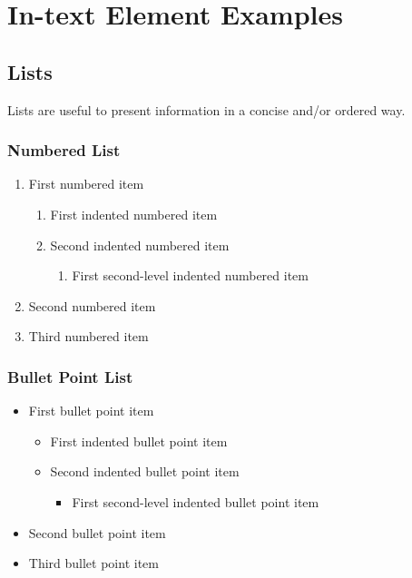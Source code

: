\documentclass[
	11pt, %
	fleqn, %
	a4paper, %
]{LegrandOrangeBook}
\begin{document}
\chapter{In-text Element Examples}




\section{Lists}

Lists are useful to present information in a concise and/or ordered way.

\subsection{Numbered List}

\begin{enumerate}
	\item First numbered item
	      \begin{enumerate}
		      \item First indented numbered item
		      \item Second indented numbered item
		            \begin{enumerate}
			            \item First second-level indented numbered item
		            \end{enumerate}
	      \end{enumerate}
	\item Second numbered item
	\item Third numbered item
\end{enumerate}

\subsection{Bullet Point List}

\begin{itemize}
	\item First bullet point item
	      \begin{itemize}
		      \item First indented bullet point item
		      \item Second indented bullet point item
		            \begin{itemize}
			            \item First second-level indented bullet point item
		            \end{itemize}
	      \end{itemize}
	\item Second bullet point item
	\item Third bullet point item
\end{itemize}
\end{document}
